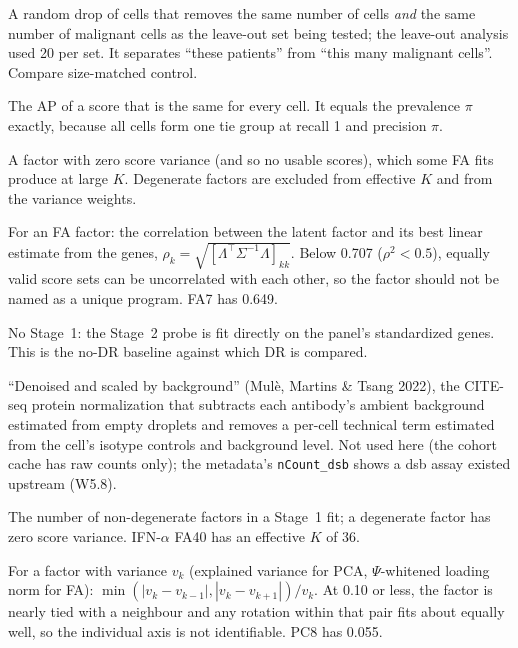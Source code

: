 \begin{description}[leftmargin=0pt,itemsep=3pt,font=\normalfont\bfseries]
\item[Composition-matched control.] A random drop of cells that removes the same number of cells \emph{and} the same number of malignant cells as the leave-out set being tested; the leave-out analysis used 20 per set. It separates ``these patients'' from ``this many malignant cells''. Compare size-matched control.

\item[Constant-score no-skill AP.] The AP of a score that is the same for every cell. It equals the prevalence $\pi$ exactly, because all cells form one tie group at recall 1 and precision $\pi$.

\item[Degenerate factor.] A factor with zero score variance (and so no usable scores), which some FA fits produce at large $K$. Degenerate factors are excluded from effective $K$ and from the variance weights.

\item[Determinacy (factor-score determinacy, $\rho$).] For an FA factor: the correlation between the latent factor and its best linear estimate from the genes, $\rho_k=\sqrt{[\Lambda^{\top}\Sigma^{-1}\Lambda]_{kk}}$. Below 0.707 ($\rho^2<0.5$), equally valid score sets can be uncorrelated with each other, so the factor should not be named as a unique program. FA7 has 0.649.

\item[Direct-gene representation (direct-gene probe).] No Stage~1: the Stage~2 probe is fit directly on the panel's standardized genes. This is the no-DR baseline against which DR is compared.

\item[dsb.] ``Denoised and scaled by background'' (Mul\`e, Martins \& Tsang 2022), the CITE-seq protein normalization that subtracts each antibody's ambient background estimated from empty droplets and removes a per-cell technical term estimated from the cell's isotype controls and background level. Not used here (the cohort cache has raw counts only); the metadata's \texttt{nCount\_dsb} shows a dsb assay existed upstream (W5.8).

\item[Effective $K$.] The number of non-degenerate factors in a Stage~1 fit; a degenerate factor has zero score variance. IFN-$\alpha$ FA40 has an effective $K$ of 36.

\item[Eigengap (relative).] For a factor with variance $v_k$ (explained variance for PCA, $\Psi$-whitened loading norm for FA): $\min(|v_k-v_{k-1}|,|v_k-v_{k+1}|)/v_k$. At 0.10 or less, the factor is nearly tied with a neighbour and any rotation within that pair fits about equally well, so the individual axis is not identifiable. PC8 has 0.055.


\end{description}
